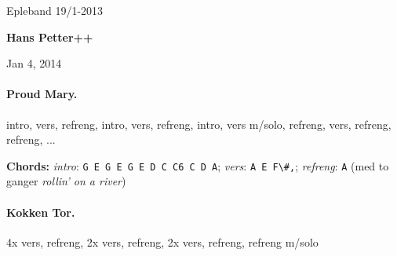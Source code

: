 \documentclass[%
twoside,                 %
final,                   %
10pt]{article}
\begin{document}




\thispagestyle{empty}

\begin{center}
{\LARGE\bf
\begin{spacing}{1.25}
Epleband 19/1-2013
\end{spacing}
}
\end{center}




\begin{center}
{\bf Hans Petter++${}^{}$} \\ [0mm]
\end{center}

\begin{center}
\end{center}


\begin{center}
Jan 4, 2014
\end{center}

\vspace{1cm}



\tableofcontents

\vspace{1cm} %





\paragraph{Proud Mary.}
intro, vers, refreng, intro, vers, refreng, intro, vers m/solo, refreng,
vers, refreng, refreng, ...

\textbf{Chords:} \emph{intro}: \Verb!G E G E G E D C C6 C D A!;
\emph{vers}: \Verb!A E F\#,!; \emph{refreng}: \Verb!A! (med to ganger \emph{rollin' on a river})




\paragraph{Kokken Tor.}
4x vers, refreng, 2x vers, refreng, 2x vers, refreng, refreng m/solo
\end{document}
